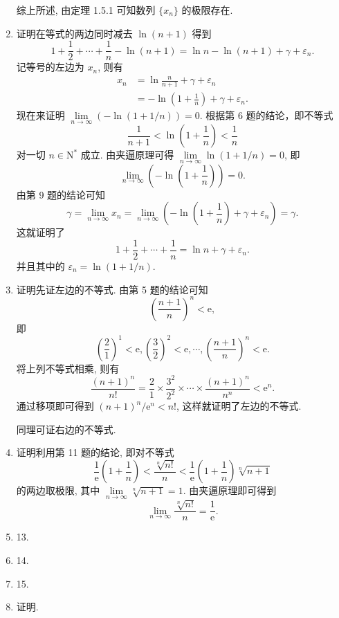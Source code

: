 \begin{enumerate}
        综上所述, 由定理 1.5.1 可知数列 $\{x_n\}$ 的极限存在.
    \item {\heiti 证明}\quad 在等式的两边同时减去 $\ln(n+1)$ 得到
        \begin{equation*}
            1 + \frac12 + \cdots + \frac1n - \ln(n+1) = \ln n - \ln(n+1) + \gamma + \varepsilon_n.
        \end{equation*}
        记等号的左边为 $x_n$, 则有
        \begin{align*}
            x_n &= \ln\frac{n}{n+1} + \gamma + \varepsilon_n \\
            &= -\ln\left(1+\frac1n\right) + \gamma + \varepsilon_n.
        \end{align*}
        现在来证明 $\lim\limits_{n\to\infty}(-\ln(1 + 1/n)) = 0$. 根据第 6 题的结论，即不等式
        \[
            \frac{1}{n+1} < \ln\left(1 + \frac1n\right) < \frac1n    
        \]
        对一切 $n \in \mathrm{N}^*$ 成立. 由夹逼原理可得 $\lim\limits_{n\to\infty}\ln(1 + 1/n) = 0$, 即
        \[
            \lim\limits_{n\to\infty}\left(-\ln\left(1 + \frac1n\right)\right) = 0.  
        \]
        由第 9 题的结论可知
        \[
            \gamma = \lim\limits_{n\to\infty}x_n = \lim\limits_{n\to\infty}\left(-\ln\left(1 + \frac1n\right) + \gamma + \varepsilon_n\right) = \gamma.
        \]
        这就证明了
        \[
            1 + \frac12 + \cdots + \frac1n = \ln n + \gamma + \varepsilon_n.  
        \]
        并且其中的 $\varepsilon_n = \ln(1 + 1/n)$.
    \item {\heiti 证明}\quad 先证左边的不等式. 由第 5 题的结论可知
        \[
            \left(\frac{n+1}{n}\right)^n < \mathrm{e},    
        \]
        即
        \begin{equation*}
            \left(\frac21\right)^1 < \mathrm{e},
            \left(\frac32\right)^2 < \mathrm{e},
            \cdots,
            \left(\frac{n+1}{n}\right)^n < \mathrm{e}.
        \end{equation*}
        将上列不等式相乘, 则有
        \[
            \frac{(n+1)^n}{n!} = \frac21\times\frac{3^2}{2^2}\times\cdots\times\frac{(n+1)^n}{n^n} < \mathrm{e}^n.    
        \]
        通过移项即可得到 $(n+1)^n/\mathrm{e}^n < n!$, 这样就证明了左边的不等式.

        同理可证右边的不等式.
    \item {\heiti 证明}\quad 利用第 11 题的结论, 即对不等式
        \[
            \frac{1}{\mathrm{e}}\left(1 + \frac1n\right) < \frac{\sqrt[n]{n!}}{n} < \frac{1}{\mathrm{e}}\left(1 + \frac1n\right)\sqrt[n]{n+1}  
        \]
        的两边取极限, 其中 $\lim\limits_{n\to\infty}\sqrt[n]{n+1} = 1$. 由夹逼原理即可得到
        \[
            \lim\limits_{n\to\infty}\frac{\sqrt[n]{n!}}{n} = \frac{1}{\mathrm{e}}.    
        \]
    \item 13.
    \item 14.
    \item 15.
    \item {\heiti 证明}\quad.
\end{enumerate}
% 
